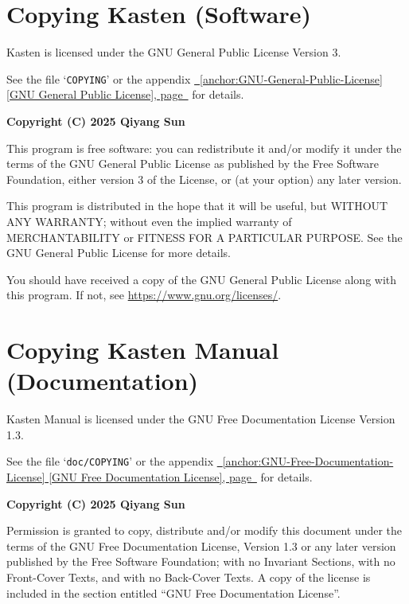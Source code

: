 \documentclass{book}
\renewcommand{\_}{\Texinfounderscore\discretionary{}{}{}}
\begin{document}
\section{{Copying Kasten (Software)}}
\label{anchor:Copying-Kasten-_0028Software_0029}%

Kasten is licensed under the GNU General Public License Version 3.

See the file `\texttt{COPYING}' or the appendix \hyperref[anchor:GNU-General-Public-License]{\chaptername~\ref*{anchor:GNU-General-Public-License} [GNU General Public License], page~\pageref*{anchor:GNU-General-Public-License}} for details.

\textbf{Copyright (C) 2025 Qiyang Sun}

This program is free software: you can redistribute it and/or modify it under
the terms of the GNU General Public License as published by the Free Software
Foundation, either version 3 of the License, or (at your option) any later
version.

This program is distributed in the hope that it will be useful, but WITHOUT ANY
WARRANTY; without even the implied warranty of MERCHANTABILITY or FITNESS FOR A
PARTICULAR PURPOSE\@. See the GNU General Public License for more details.

You should have received a copy of the GNU General Public License along with
this program. If not, see \url{https://www.gnu.org/licenses/}.

\section{{Copying Kasten Manual (Documentation)}}
\label{anchor:Copying-Kasten-Manual-_0028Documentation_0029}%

Kasten Manual is licensed under the GNU Free Documentation License Version 1.3.

See the file `\texttt{doc/COPYING}' or the appendix \hyperref[anchor:GNU-Free-Documentation-License]{\chaptername~\ref*{anchor:GNU-Free-Documentation-License} [GNU Free Documentation License], page~\pageref*{anchor:GNU-Free-Documentation-License}} for
details.

\textbf{Copyright (C) 2025 Qiyang Sun}

Permission is granted to copy, distribute and/or modify this document under the
terms of the GNU Free Documentation License, Version 1.3 or any later version
published by the Free Software Foundation; with no Invariant Sections, with no
Front-Cover Texts, and with no Back-Cover Texts.  A copy of the license is
included in the section entitled ``GNU Free Documentation License''.
\end{document}

